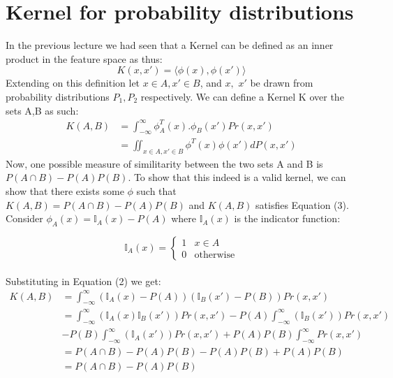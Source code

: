 \documentclass[12pt]{article}
\begin{document}
\MakeScribeTop

\section{Kernel for probability distributions}
In the previous lecture we had seen that a Kernel can be defined as an inner product in the feature space as thus:
\begin{equation}
    K(x, x') = \langle \phi(x),\phi(x') \rangle
\end{equation}
Extending on this definition let $x \in A, x' \in B$, and $x,$ $x'$ be drawn from probability distributions $P_1, P_2$ respectively. We can define a Kernel K over the sets A,B as such:
\begin{align}
    K(A,B) &= \int_{-\infty}^{\infty} \phi_A^T(x).\phi_B(x')Pr(x,x')\\
    &= \iint_{x \in A, x' \in B} \phi^T(x)\phi(x')dP(x,x')
\end{align}
Now, one possible measure of similitarity between the two sets A and B is $P(A \cap B) - P(A)P(B)$. To show that this indeed is a valid kernel, we can show that there exists some $\phi$ such that $K(A,B) = P(A \cap B) - P(A)P(B)$ and $K(A,B)$ satisfies Equation (3).
\\

\noindent Consider $\phi_A(x) = \mathbb{I}_A(x) - P(A)$ where $\mathbb{I}_A(x)$ is the indicator function:

\begin{equation*}
    \mathbb{I}_A(x) = 
    \begin{cases}
      1 & x \in A \\
      0 & \text{otherwise}
    \end{cases}
\end{equation*}
\\
Substituting in Equation (2) we get:
\begin{align*}
    K(A,B) &= \int_{-\infty}^{\infty} (\mathbb{I}_A(x) - P(A))(\mathbb{I}_B(x') - P(B))Pr(x,x')\\
    &= \int_{-\infty}^{\infty} (\mathbb{I}_A(x) \mathbb{I}_B(x')) Pr(x,x') - P(A)\int_{-\infty}^{\infty}  (\mathbb{I}_B(x')) Pr(x,x') \\
    &- P(B)\int_{-\infty}^{\infty}  (\mathbb{I}_A(x')) Pr(x,x') + P(A)P(B)\int_{-\infty}^{\infty} Pr(x,x')\\
    &= P(A \cap B) - P(A)P(B) - P(A)P(B) + P(A)P(B)\\
    &= P(A \cap B) - P(A)P(B)
\end{align*}
\end{document}
